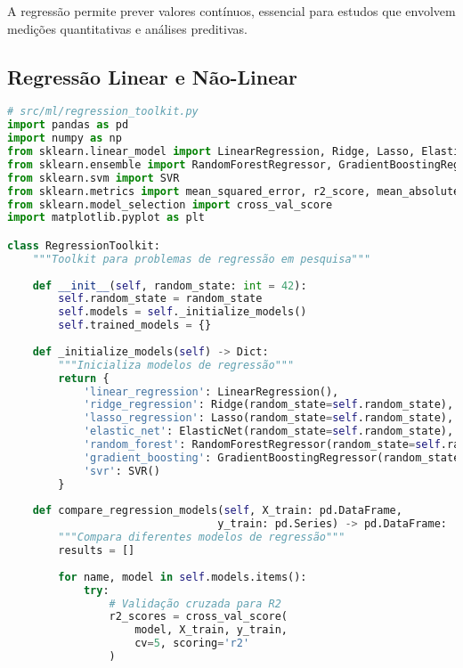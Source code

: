 A regressão permite prever valores contínuos, essencial para estudos que envolvem medições quantitativas e análises preditivas.

\subsection{Regressão Linear e Não-Linear}

\begin{pythonbox}
\begin{lstlisting}[language=Python]
# src/ml/regression_toolkit.py
import pandas as pd
import numpy as np
from sklearn.linear_model import LinearRegression, Ridge, Lasso, ElasticNet
from sklearn.ensemble import RandomForestRegressor, GradientBoostingRegressor
from sklearn.svm import SVR
from sklearn.metrics import mean_squared_error, r2_score, mean_absolute_error
from sklearn.model_selection import cross_val_score
import matplotlib.pyplot as plt

class RegressionToolkit:
    """Toolkit para problemas de regressão em pesquisa"""
    
    def __init__(self, random_state: int = 42):
        self.random_state = random_state
        self.models = self._initialize_models()
        self.trained_models = {}
        
    def _initialize_models(self) -> Dict:
        """Inicializa modelos de regressão"""
        return {
            'linear_regression': LinearRegression(),
            'ridge_regression': Ridge(random_state=self.random_state),
            'lasso_regression': Lasso(random_state=self.random_state),
            'elastic_net': ElasticNet(random_state=self.random_state),
            'random_forest': RandomForestRegressor(random_state=self.random_state),
            'gradient_boosting': GradientBoostingRegressor(random_state=self.random_state),
            'svr': SVR()
        }
    
    def compare_regression_models(self, X_train: pd.DataFrame, 
                                 y_train: pd.Series) -> pd.DataFrame:
        """Compara diferentes modelos de regressão"""
        results = []
        
        for name, model in self.models.items():
            try:
                # Validação cruzada para R2
                r2_scores = cross_val_score(
                    model, X_train, y_train, 
                    cv=5, scoring='r2'
                )
\end{lstlisting}
\end{pythonbox}
